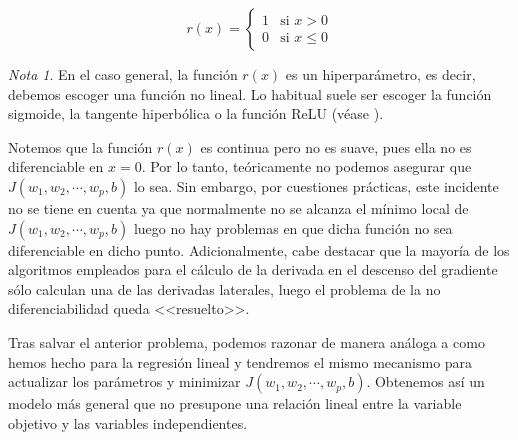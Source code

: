 \documentclass[12pt, a4paper, twoside]{book}
\numberwithin{equation}{section}
\theoremstyle{definition}
\theoremstyle{remark}
\newtheorem*{remark}{Nota}
\theoremstyle{plain}
\begin{document}
	\begin{equation}
		\label{def:r}
		r(x)=\left \{
			\begin{array}{ll}
				1&\text{si }x>0\\
				0&\text{si }x\leq0
			\end{array} 
		     \right .
	\end{equation}

	\begin{remark}
	En el caso general, la función $r(x)$ es un hiperparámetro, es decir,
	debemos escoger una función no lineal. Lo habitual suele ser escoger
	la función sigmoide, la tangente hiperbólica o la función ReLU (véase 
	\cite{Goodfellow-et-al-2016}).
	\end{remark}
	
	Notemos que la función $r(x)$ es continua pero no es suave, pues ella
	no es diferenciable en $x=0$. Por lo tanto, teóricamente no podemos 
	asegurar que $J(w_{1},w_{2},\cdots,w_{p},b)$ lo sea. Sin embargo, por 
	cuestiones prácticas, 
	este incidente no se tiene en cuenta ya que normalmente no se alcanza
	el mínimo local de $J(w_{1},w_{2},\cdots,w_{p},b)$ luego no hay 
	problemas en que dicha 
	función no sea diferenciable en dicho punto. Adicionalmente, cabe 
	destacar que la mayoría de los algoritmos empleados para el cálculo de 
	la derivada en el descenso del gradiente sólo calculan una de las 
	derivadas laterales, luego el problema de la no diferenciabilidad 
	queda <<resuelto>>.

	Tras salvar el anterior problema, podemos razonar de manera análoga
	a como hemos hecho para la regresión lineal y tendremos el mismo 
	mecanismo para actualizar los parámetros y minimizar $J(w_{1},w_{2},
	\cdots,w_{p},b)$. 
	Obtenemos así un modelo más general que no presupone una relación 
	lineal entre la variable objetivo y las variables independientes. 
	
\end{document}
